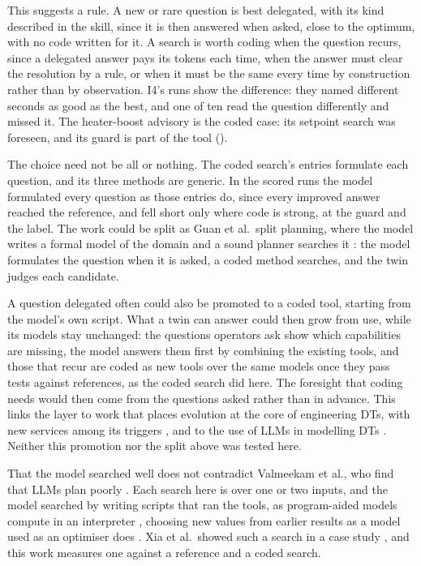   This suggests a rule. A new or rare question is best delegated, with its kind described
  in the skill, since it is then answered when asked, close to the optimum, with no code written
  for it. A search is worth coding when the question recurs, since a delegated answer pays its
  tokens each time, when the answer must clear the resolution by a rule, or when it must be the
  same every time by construction rather than by observation. I4's runs show the difference:
  they named different seconds as good as the best, and one of ten read the question
  differently and missed it. The heater-boost advisory is the
  coded case: its setpoint search was foreseen, and its guard is part of the tool
  ().

  The choice need not be all or nothing. The coded search's entries formulate each question, and
  its three methods are generic. In the scored runs the model formulated every question as those
  entries do, since every improved answer reached the reference, and fell short only where code is
  strong, at the guard and the label. The work could be split as Guan et al.\ split planning, where the model
  writes a formal model of the domain and a sound planner searches it \cite{guan2023worldmodels}:
  the model formulates the question when it is asked, a coded method searches, and the twin judges
  each candidate.

  A question delegated often could also be promoted to a coded tool, starting from the model's own
  script. What a twin can answer could then grow from use, while its models stay unchanged: the
  questions operators ask show which capabilities are missing, the model answers them first by
  combining the existing tools, and those that recur are coded as new tools over the same models
  once they pass tests against references, as the coded search did here. The foresight that
  coding needs would then come from the questions asked rather than in advance. This links the
  layer to work that places evolution at the core of engineering DTs, with new services among its
  triggers \cite{alskaif2025evolution}, and to the use of LLMs in modelling DTs
  \cite{yang2025llmdtmodeling}. Neither this promotion nor the split above was tested here.

  That the model searched well does not contradict Valmeekam et al., who find that LLMs
  plan poorly \cite{valmeekam2023planbench}. Each search here is over one or two inputs, and the
  model searched by writing scripts that ran the tools, as program-aided models compute in an
  interpreter \cite{gao2023pal}, choosing new values from earlier results as a model used as an
  optimiser does \cite{yang2024opro}. Xia et al.\ showed such a search in a case study
  \cite{xia2024llmsimulation}, and this work measures one against a reference and a coded search.

